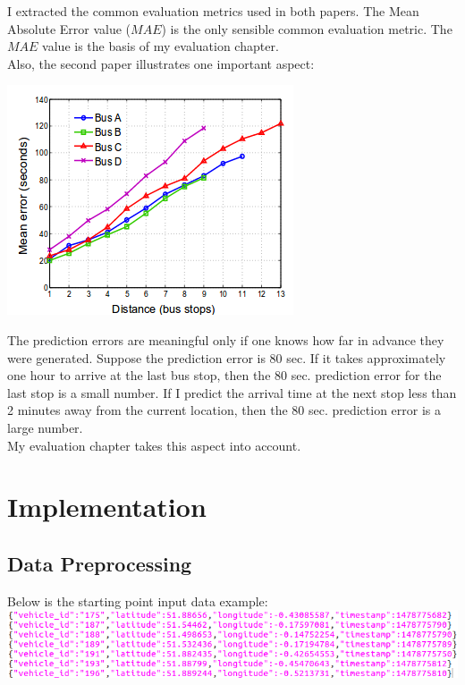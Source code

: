 \documentclass[12pt,a4paper,oneside,openright]{report}
\begin{document}
I extracted the common evaluation metrics used in both papers. The Mean Absolute Error value
($MAE$) is the only sensible common evaluation metric. The $MAE$ value is the basis of my evaluation
chapter. \\

Also, the second paper illustrates one important aspect:

\includegraphics[scale=0.8]{figs/second_paper.png}

The prediction errors are meaningful only if one knows how far in advance they were
generated. Suppose the prediction error is 80 sec. If it takes approximately one hour to arrive at
the last bus stop, then the 80 sec. prediction error for the last stop is a small number.
If I predict the arrival time at the next stop less than 2 minutes away from the current location,
then the 80 sec. prediction error is a large number. \\

My evaluation chapter takes this aspect into account.




\chapter{Implementation}

\section{Data Preprocessing}

Below is the starting point input data example: \\
\includegraphics[scale=0.6]{figs/starting_data.png}
\end{document}
